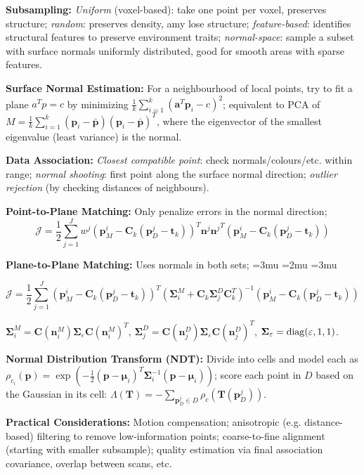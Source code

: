 \documentclass[twocolumn, 8pt]{extarticle}
\newenvironment{tight}
  {\begingroup
   \setlength{\arraycolsep}{2pt}
   \thinmuskip=3mu       %
   \medmuskip=2mu        %
   \thickmuskip=3mu      %
  }
  {
    \endgroup
  }
\begin{document}
\textbf{Subsampling:} \emph{Uniform} (voxel-based): take one point per voxel, preserves structure; \emph{random}:
preserves density, amy lose structure; \emph{feature-based}: identifies structural features to preserve environment
traits; \emph{normal-space}: sample a subset with surface normals uniformly distributed, good for smooth areas with
sparse features.

\textbf{Surface Normal Estimation:} For a neighbourhood of local points, try to fit a plane $a^Tp = c$
by minimizing $\frac{1}{k}\sum _{i = 1}^k (\bm a^T\bm p_i - c)^2$; equivalent to PCA of
$M = \frac{1}{k}\sum _{i = 1}^k (\bm p_i - \bar{\bm p})(\bm p_i - \bar{\bm p})^T$, where the eigenvector of the smallest
eigenvalue (least variance) is the normal.

\textbf{Data Association:} \emph{Closest compatible point}: check normals/colours/etc. within range; \emph{normal
shooting}: first point along the surface normal direction; \emph{outlier rejection} (by checking distances of
neighbours).

\textbf{Point-to-Plane Matching:} Only penalize errors in the normal direction;
\[\mathcal J = \frac{1}{2}\sum _{j = 1}^J w^j\left(\bm p_M^i - \bm C_k\left(\bm p_D^j - \bm t_k\right)\right)^T{\bm n^j}{\bm n^j}^T\left(\bm p_M^i - \bm C_k\left(\bm p_D^j - \bm t_k\right)\right)\]

\textbf{Plane-to-Plane Matching:} Uses normals in both sets;
\begin{tight}
  \[\mathcal J = \frac{1}{2}\sum _{j = 1}^J\left(\bm p_M^i - \bm C_k(\bm p_D^j - \bm t_k)\right)^T(\bm\Sigma _i^M + \bm C_k\bm\Sigma _j^D\bm C_k^T)^{-1}\left(\bm p_M^i - \bm C_k(\bm p_D^j - \bm t_k)\right)\]
\end{tight}

$\bm\Sigma _i^M = \bm C(\bm n_i^M)\bm\Sigma _\varepsilon\bm C(\bm n_i^M)^T$,
$\bm\Sigma _j^D = \bm C(\bm n_j^D)\bm\Sigma _\varepsilon\bm C(\bm n_j^D)^T$,
\(\bm\Sigma _\varepsilon = \operatorname{diag}(\varepsilon, 1, 1)\).

\textbf{Normal Distribution Transform (NDT):} Divide into cells and model each as
$\rho _{c_i}(\bm p) = \exp\left(-\frac{1}{2}(\bm p - \bm\mu _i)^T\bm\Sigma _i^{-1}(\bm p - \bm\mu _i)\right)$;
score each point in \(D\) based on the Gaussian in its cell: $\Lambda(\bm T) = -\sum _{\bm p_D^j \in D}\rho _c(\bm T(\bm p_D^j))$.

\textbf{Practical Considerations:} Motion compensation; anisotropic (e.g. distance-based) filtering to remove
low-information points; coarse-to-fine alignment (starting with smaller subsample); quality estimation via final
association covariance, overlap between scans, etc.
\end{document}
